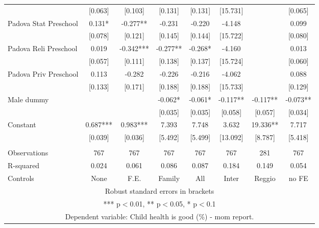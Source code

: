 \begin{tabular}{lccccccc}
 & [0.063] & [0.103] & [0.131] & [0.131] & [15.731] &  & [0.065] \\
Padova Stat Preschool & 0.131* & -0.277** & -0.231 & -0.220 & -4.148 &  & 0.099 \\
 & [0.078] & [0.121] & [0.145] & [0.144] & [15.722] &  & [0.080] \\
Padova Reli Preschool & 0.019 & -0.342*** & -0.277** & -0.268* & -4.160 &  & 0.013 \\
 & [0.057] & [0.111] & [0.138] & [0.137] & [15.724] &  & [0.060] \\
Padova Priv Preschool & 0.113 & -0.282 & -0.226 & -0.216 & -4.062 &  & 0.088 \\
 & [0.133] & [0.171] & [0.188] & [0.188] & [15.733] &  & [0.129] \\
Male dummy &  &  & -0.062* & -0.061* & -0.117** & -0.117** & -0.073** \\
 &  &  & [0.035] & [0.035] & [0.058] & [0.057] & [0.034] \\
Constant & 0.687*** & 0.983*** & 7.393 & 7.748 & 3.632 & 19.336** & 7.717 \\
 & [0.039] & [0.036] & [5.492] & [5.499] & [13.092] & [8.787] & [5.418] \\
 &  &  &  &  &  &  &  \\
Observations & 767 & 767 & 767 & 767 & 767 & 281 & 767 \\
R-squared & 0.024 & 0.061 & 0.086 & 0.087 & 0.184 & 0.149 & 0.054 \\
 Controls & None & F.E. & Family & All & Inter & Reggio & no FE \\ \hline
\multicolumn{8}{c}{ Robust standard errors in brackets} \\
\multicolumn{8}{c}{ *** p$<$0.01, ** p$<$0.05, * p$<$0.1} \\
\multicolumn{8}{c}{ Dependent variable: Child health is good (\%) - mom report.} \\
\end{tabular}
